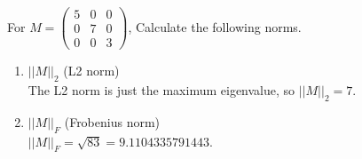 \documentclass[a4paper]{article}
\theoremstyle{definition}
\newenvironment{soln}{
	\leavevmode\color{blue}\ignorespaces
}{}
\begin{document}
\begin{enumerate}
\begin{soln}
		\end{soln}
	\end{enumerate}
	
	For $M = \begin{pmatrix}
		5 & 0 & 0 \\ 0 & 7 & 0 \\ 0 & 0 & 3
		
	\end{pmatrix}$, Calculate the following norms.
	\begin{enumerate}\addtocounter{enumi}{3}
		\item $||M||_{2}$ (L2 norm) \\
		\begin{soln}  The L2 norm is just the maximum eigenvalue, so $ ||M||_{2} = 7 $. \end{soln}
		
		\item $||M||_{F}$ (Frobenius norm)\\
		\begin{soln}  $ ||M||_{F} = \sqrt{83} = 9.1104335791443 $. \end{soln}
		
		
	\end{enumerate}
	
	
	
\end{document}
